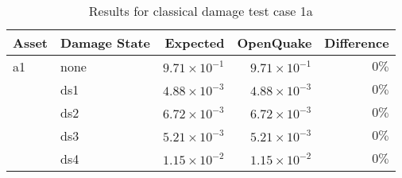 \begin{table}[htbp]

\centering
\begin{tabular}{ l l r r r }

\hline
\rowcolor{anti-flashwhite}
\bf{Asset} & \bf{Damage State} & \bf{Expected} & \bf{OpenQuake} & \bf{Difference}\\
\hline
a1 & none & $9.71 \times 10^{-1}$ & $9.71 \times 10^{-1}$ & $0\%$ \\
   & ds1 & $4.88 \times 10^{-3}$ & $4.88 \times 10^{-3}$ & $0\%$ \\
   & ds2 & $6.72 \times 10^{-3}$ & $6.72 \times 10^{-3}$ & $0\%$ \\
   & ds3 & $5.21 \times 10^{-3}$ & $5.21 \times 10^{-3}$ & $0\%$ \\
   & ds4 & $1.15 \times 10^{-2}$ & $1.15 \times 10^{-2}$ & $0\%$ \\
\hline
\end{tabular}

\caption{Results for classical damage test case 1a}
\label{tab:result-cd-1a}
\end{table}

